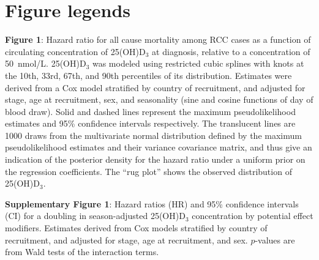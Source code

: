 \documentclass[a4paper,11pt]{article}
\begin{document}
\section*{Figure legends}
\noindent \textbf{Figure 1}: Hazard ratio for all cause mortality among RCC cases as 
a function of circulating concentration of 25(OH)D$_3$ at diagnosis, relative to a 
concentration of 50~nmol/L. 25(OH)D$_3$ was modeled using restricted cubic splines 
with knots at the 10th, 33rd, 67th, and 90th percentiles of its distribution. 
Estimates were derived from a Cox model stratified by country of recruitment, and 
adjusted for stage, age at recruitment, sex, and seasonality (sine and cosine 
functions of day of blood draw). Solid and dashed lines represent the maximum 
pseudolikelihood estimates and 95\% confidence intervals respectively. The 
translucent lines are 1000 draws from the multivariate normal distribution defined 
by the maximum pseudolikelihood estimates and their variance covariance matrix, and 
thus give an indication of the posterior density for the hazard ratio under a 
uniform prior on the regression coefficients. The ``rug plot'' shows the observed 
distribution of 25(OH)D$_3$.


\noindent \textbf{Supplementary Figure 1}: Hazard ratios (HR) and 95\% confidence 
intervals (CI) for a doubling in season-adjusted 25(OH)D$_3$ concentration by 
potential effect modifiers. \footnotesize{Estimates derived from Cox models 
stratified by country of recruitment, and adjusted for stage, age at recruitment, 
and sex. $p$-values are from Wald tests of the interaction terms.} 
\end{document}
